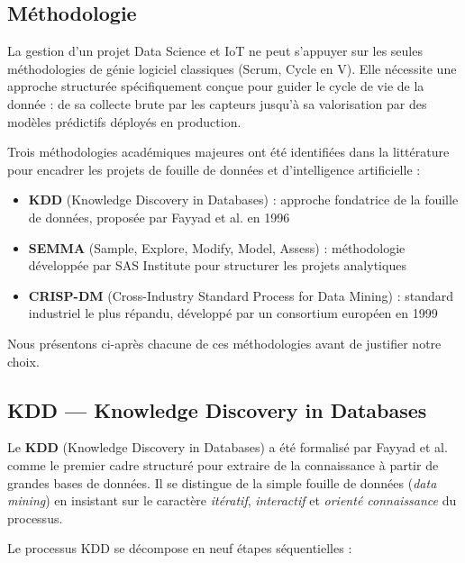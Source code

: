 \documentclass[12pt, a4paper]{report}
\begin{document}
\subsection{Méthodologie}

La gestion d'un projet Data Science et IoT ne peut s'appuyer sur les seules méthodologies de génie logiciel classiques (Scrum, Cycle en V). Elle nécessite une approche structurée spécifiquement conçue pour guider le cycle de vie de la donnée : de sa collecte brute par les capteurs jusqu'à sa valorisation par des modèles prédictifs déployés en production.

Trois méthodologies académiques majeures ont été identifiées dans la littérature pour encadrer les projets de fouille de données et d'intelligence artificielle :

\begin{itemize}[leftmargin=*, label=\textcolor{primary}{$\bullet$}]
    \item \textbf{KDD} (Knowledge Discovery in Databases) : approche fondatrice de la fouille de données, proposée par Fayyad et al. en 1996 \cite{fayyad1996}
    \item \textbf{SEMMA} (Sample, Explore, Modify, Model, Assess) : méthodologie développée par SAS Institute pour structurer les projets analytiques
    \item \textbf{CRISP-DM} (Cross-Industry Standard Process for Data Mining) : standard industriel le plus répandu, développé par un consortium européen en 1999 \cite{wirth2000}
\end{itemize}

Nous présentons ci-après chacune de ces méthodologies avant de justifier notre choix.

\subsection{KDD — Knowledge Discovery in Databases}

Le \textbf{KDD} (Knowledge Discovery in Databases) a été formalisé par Fayyad et al. \cite{fayyad1996} comme le premier cadre structuré pour extraire de la connaissance à partir de grandes bases de données. Il se distingue de la simple fouille de données (\textit{data mining}) en insistant sur le caractère \textit{itératif}, \textit{interactif} et \textit{orienté connaissance} du processus.

Le processus KDD se décompose en neuf étapes séquentielles :
\end{document}
